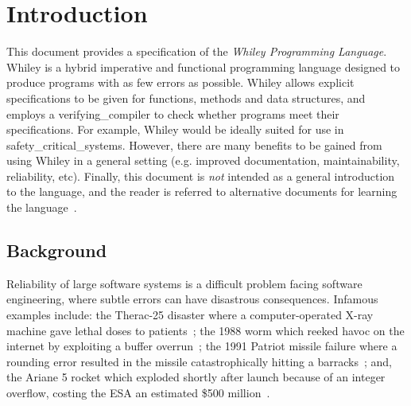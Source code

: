 \chapter{Introduction}

This document provides a specification of the {\em Whiley Programming Language}.  Whiley is a hybrid imperative and functional programming language designed to produce programs with as few errors as possible.  Whiley allows explicit specifications to be given for functions, methods and data structures, and employs a \gls{verifying_compiler} to check whether programs meet their specifications.  For example, Whiley would be ideally suited for use in \gls{safety_critical_system}s.  However, there are many benefits to be gained from using Whiley in a general setting (e.g. improved documentation, maintainability, reliability, etc).  Finally, this document is {\em not} intended as a general introduction to the language, and the reader is referred to alternative documents for learning the language~\cite{Pearce14a}.


\section{Background}

Reliability of large software systems is a difficult problem facing software engineering, where subtle errors can have disastrous consequences.  Infamous examples include: the Therac-25 disaster where a computer-operated X-ray machine gave lethal doses to patients~\cite{LT93}; the 1988 worm which reeked havoc on the internet by exploiting a buffer overrun~\cite{ER89}; the 1991 Patriot missile failure where a rounding error resulted in the missile catastrophically hitting a barracks~\cite{GAO}; and, the Ariane 5 rocket which exploded shortly after launch because of an integer overflow, costing the ESA an estimated \$500 million~\cite{ARIAN5}.


